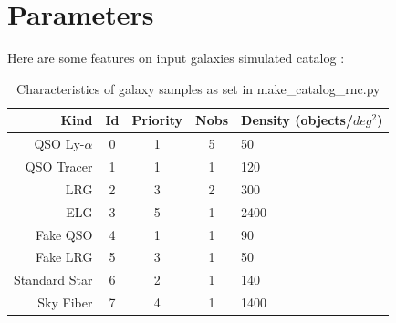 \documentclass{extarticle}
\def\sqd{$deg^{2}$}
\begin{document}
\section{Parameters}
Here are some features on input galaxies simulated catalog :


\begin{table}[H]\centering
	\begin{tabular}{rcccl} \hline
		Kind&Id&Priority&Nobs&Density (objects/\sqd)\\ \hline
		QSO Ly-$\alpha$ & 0 & 1 & 5 & 50\\
		QSO Tracer & 1 & 1 & 1 & 120\\
		LRG & 2 & 3 & 2 & 300\\
		ELG & 3 & 5 & 1 & 2400\\
		Fake QSO & 4 & 1 & 1 & 90\\
		Fake LRG & 5 & 3 & 1 & 50\\
		Standard Star & 6 & 2 & 1 & 140\\
		Sky Fiber & 7 & 4 & 1 & 1400\\ \hline
	\end{tabular}
	\caption{Characteristics of galaxy samples as set in make\_catalog\_rnc.py}\label{table:characteristics}
\end{table}
\end{document}
